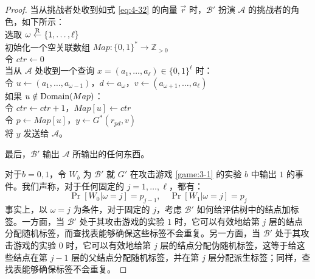 \begin{proof}
\hspace*{5pt} 当从挑战者处收到如式 \ref{eq:4-32} 的向量 $\vec r$ 时，$\mathcal{B}'$ 扮演 $\mathcal{A}$ 的挑战者的角色，如下所示：\\
\hspace*{50pt} 选取 $\omega\overset{\rm R}\leftarrow\{1,\dots,\ell\}$\\
\hspace*{50pt} 初始化一个空关联数组 $Map:\{0,1\}^*\to\mathbb{Z}_{>0}$\\
\hspace*{50pt} 令 $ctr\leftarrow 0$\\
\hspace*{50pt} 当从 $\mathcal{A}$ 处收到一个查询 $x=(a_1,\dots,a_\ell)\in\{0,1\}^\ell$ 时：\\
\hspace*{75pt} 令 $u\leftarrow(a_1,\dots,a_{\omega-1})$，$d\leftarrow a_\omega$，$v\leftarrow(a_{\omega+1},\dots,a_\ell)$\\
\hspace*{75pt} 如果 $u\notin{\rm Domain}(Map)$：\\
\hspace*{100pt} 令 $ctr\leftarrow ctr+1$，$Map[u]\leftarrow ctr$\\
\hspace*{75pt} 令 $p\leftarrow Map[u]$，$y\leftarrow G^*(r_{pd},v)$\\
\hspace*{75pt} 将 $y$ 发送给 $\mathcal{A}$。

\vspace{3pt}

\hspace*{5pt} 最后，$\mathcal{B}'$ 输出 $\mathcal{A}$ 所输出的任何东西。

\vspace{5pt}

对于$b=0,1$，令 $W_b$ 为 $\mathcal{B}'$ 就 $G'$ 在攻击游戏 \ref{game:3-1} 的实验 $b$ 中输出 $1$ 的事件。我们声称，对于任何固定的 $j=1,\dots,\ell$，都有：
\[
\Pr[W_0|\omega=j]=p_{j-1},
\quad
\Pr[W_1|\omega=j]=p_j
\]
事实上，以 $\omega=j$ 为条件，对于固定的 $j$，考虑 $\mathcal{B}'$ 如何给评估树中的结点加标签。一方面，当 $\mathcal{B}'$ 处于其攻击游戏的实验 $1$ 时，它可以有效地给第 $j$ 层的结点分配随机标签，而查找表能够确保这些标签不会重复。另一方面，当 $\mathcal{B}'$ 处于其攻击游戏的实验 $0$ 时，它可以有效地给第 $j$ 层的结点分配伪随机标签，这等于给这些结点在第 $j-1$ 层的父结点分配随机标签，并在第 $j$ 层分配派生标签；同样，查找表能够确保标签不会重复。


\end{proof}
